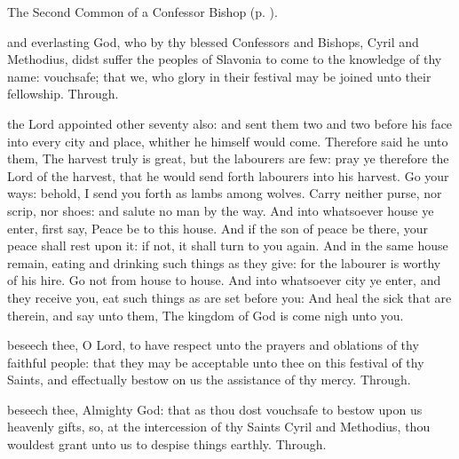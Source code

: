 \begin{rubric}
	The Second Common of a Confessor Bishop (p. \pageref{CommonConfessorBishopII}).
\end{rubric}

\collect
{} and everlasting God, who by thy blessed Confessors and Bishops, Cyril and Methodius, didst suffer the peoples of Slavonia to come to the knowledge of thy name: vouchsafe; that we, who glory in their festival may be joined unto their fellowship. Through.

 the Lord appointed other seventy also: and sent them two and two before his face into every city and place, whither he himself would come. Therefore said he unto them, The harvest truly is great, but the labourers are few: pray ye therefore the Lord of the harvest, that he would send forth labourers into his harvest. Go your ways: behold, I send you forth as lambs among wolves. Carry neither purse, nor scrip, nor shoes: and salute no man by the way. And into whatsoever house ye enter, first say, Peace be to this house. And if the son of peace be there, your peace shall rest upon it: if not, it shall turn to you again. And in the same house remain, eating and drinking such things as they give: for the labourer is worthy of his hire. Go not from house to house. And into whatsoever city ye enter, and they receive you, eat such things as are set before you: And heal the sick that are therein, and say unto them, The kingdom of God is come nigh unto you.


\secret
{} beseech thee, O Lord, to have respect unto the prayers and oblations of thy faithful people: that they may be acceptable unto thee on this festival of thy Saints, and effectually bestow on us the assistance of thy mercy. Through.


\postcommunion
{} beseech thee, Almighty God: that as thou dost vouchsafe to bestow upon us heavenly gifts, so, at the intercession of thy Saints Cyril and Methodius, thou wouldest grant unto us to despise things earthly. Through.


\label{SevenHolyBrothers}

